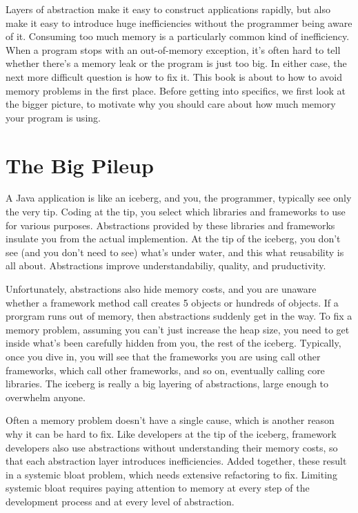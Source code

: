 Layers of abstraction make it easy to construct applications
rapidly, but also make it easy to introduce huge inefficiencies without the
programmer being aware of it. Consuming too much memory is a particularly common
kind of inefficiency. When a program stops with an out-of-memory exception, it's
often hard to tell whether there's a memory leak or the program is just too big. 
In either case, the next more difficult
question is how to fix it. This book is about to how to avoid memory problems in the first place. Before
getting into specifics, we first look at the bigger picture, to motivate
why you should care about how much memory your program is using.


\section{The Big Pileup}

A Java application is like an iceberg, and you, the programmer, typically see
only the very tip. Coding at the tip, you select which libraries
and frameworks to use for various purposes. Abstractions provided by these
libraries and frameworks insulate you from the actual implemention. At the tip
of the iceberg, you don't see (and you don't need to see) what's under water,
and this what reusability is all about. Abstractions improve understandabiliy, quality, and
pruductivity. 

Unfortunately, abstractions also hide memory costs, and
 you are unaware whether a framework method call creates 5 objects 
or hundreds of objects. If a prorgram runs out of memory,
then abstractions suddenly get in the way. To fix a memory problem, assuming
you can't just increase the heap size, you need to get inside what's been
carefully hidden from you, the rest of the iceberg. Typically, once you dive in,
you will see that the frameworks you are using call
other frameworks, which call other frameworks, and so on, eventually calling
core libraries. The iceberg is really a big layering of abstractions, large
enough to overwhelm anyone. 

Often a memory problem doesn't have a single cause, which is another reason why
it can be hard to fix. Like developers at the tip of the iceberg, framework
developers also use abstractions without understanding their memory costs, so
that each abstraction layer introduces inefficiencies. Added together, these  
result in a systemic bloat problem, which needs extensive refactoring to
fix. Limiting systemic bloat requires paying attention to memory
 at every step of the development process and at every level of abstraction.


